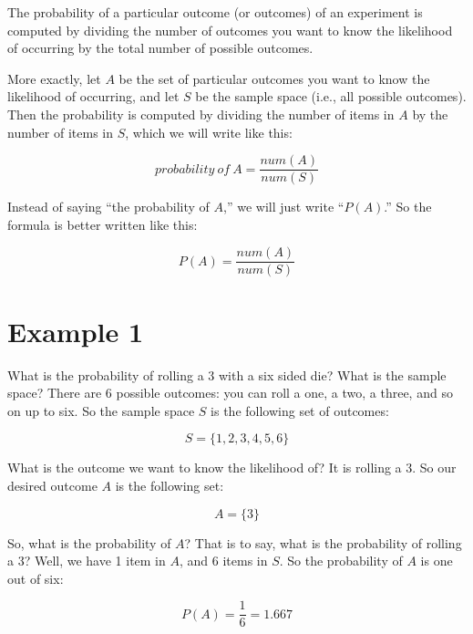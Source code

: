 \documentclass[../../../main.tex]{subfiles}
\begin{document}
The probability of a particular outcome (or outcomes) of an experiment is computed by dividing the number of outcomes you want to know the likelihood of occurring by the total number of possible outcomes. 

More exactly, let $A$ be the set of particular outcomes you want to know the likelihood of occurring, and let $S$ be the sample space (i.e., all possible outcomes). Then the probability is computed by dividing the number of items in $A$ by the number of items in $S$, which we will write like this:

\begin{equation*}
  probability~of~A = \frac{num(A)}{num(S)}
\end{equation*}

\noindent
Instead of saying ``the probability of $A$,'' we will just write ``$P(A)$.'' So the formula is better written like this:

\begin{equation*}
  P(A) = \frac{num(A)}{num(S)}
\end{equation*}


\section{Example 1}

What is the probability of rolling a 3 with a six sided die? What is the sample space? There are 6 possible outcomes: you can roll a one, a two, a three, and so on up to six. So the sample space $S$ is the following set of outcomes: 

\begin{equation*}
  S = \{ 1, 2, 3, 4, 5, 6 \}
\end{equation*}

\noindent
What is the outcome we want to know the likelihood of? It is rolling a 3. So our desired outcome $A$ is the following set:

\begin{equation*}
  A = \{ 3 \}
\end{equation*}

\noindent
So, what is the probability of $A$? That is to say, what is the probability of rolling a 3? Well, we have 1 item in $A$, and 6 items in $S$. So the probability of $A$ is one out of six:

\begin{equation*}
  P(A) = \frac{1}{6} = 1.667
\end{equation*}
\end{document}
